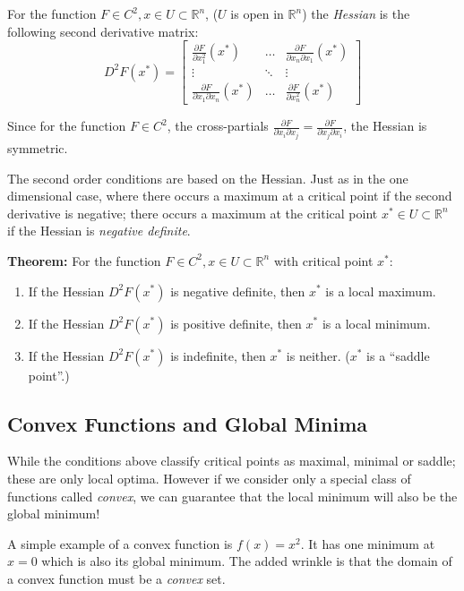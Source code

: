 \documentclass[11pt,]{article}
\providecommand{\tightlist}{%
  \setlength{\itemsep}{0pt}\setlength{\parskip}{0pt}}
\begin{document}
For the function \(F\in C^2, x\in U\subset \mathbb{R}^n\), (\(U\) is
open in \(\mathbb{R}^n\)) the \emph{Hessian} is the following second
derivative matrix: \[
D^2F(x^*) = \begin{bmatrix}
\frac{\partial F}{\partial x_1^2}(x^*) & \hdots &\frac{\partial F}{\partial x_n\partial x_1}(x^*)\\
\vdots & \ddots & \vdots\\
\frac{\partial F}{\partial x_1\partial x_n}(x^*) & \hdots & \frac{\partial F}{\partial x_n^2}(x^*)
\end{bmatrix}
\]

Since for the function \(F\in C^2\), the cross-partials
\(\frac{\partial F}{\partial x_i \partial x_j} = \frac{\partial F}{\partial x_j \partial x_i}\),
the Hessian is symmetric.

The second order conditions are based on the Hessian. Just as in the one
dimensional case, where there occurs a maximum at a critical point if
the second derivative is negative; there occurs a maximum at the
critical point \(x^*\in U\subset \mathbb{R}^n\) if the Hessian is
\emph{negative definite}.

\textbf{Theorem:} For the function
\(F\in C^2, x\in U\subset \mathbb{R}^n\) with critical point \(x^*\):

\begin{enumerate}
\def\labelenumi{\arabic{enumi}.}
\tightlist
\item
  If the Hessian \(D^2F(x^*)\) is negative definite, then \(x^*\) is a
  local maximum.
\item
  If the Hessian \(D^2F(x^*)\) is positive definite, then \(x^*\) is a
  local minimum.
\item
  If the Hessian \(D^2F(x^*)\) is indefinite, then \(x^*\) is neither.
  (\(x^*\) is a ``saddle point''.)
\end{enumerate}

\subsection{Convex Functions and Global
Minima}\label{convex-functions-and-global-minima}

While the conditions above classify critical points as maximal, minimal
or saddle; these are only local optima. However if we consider only a
special class of functions called \emph{convex}, we can guarantee that
the local minimum will also be the global minimum!

A simple example of a convex function is \(f(x) = x^2\). It has one
minimum at \(x=0\) which is also its global minimum. The added wrinkle
is that the domain of a convex function must be a \emph{convex} set.
\end{document}
